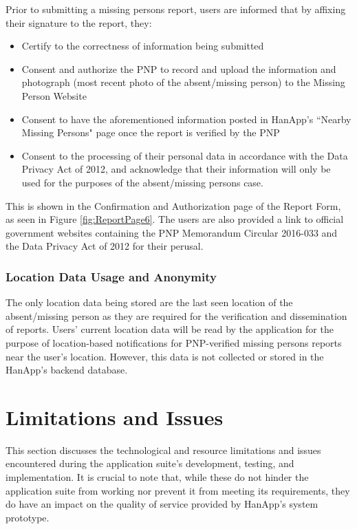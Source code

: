 Prior to submitting a missing persons report, users are informed that by affixing their signature to the report, they:
\begin{itemize}
    \item Certify to the correctness of information being submitted
    \item Consent and authorize the PNP to record and upload the information and photograph (most recent photo of the absent/missing person) to the Missing Person Website
    \item Consent to have the aforementioned information posted in HanApp's ``Nearby Missing Persons" page once the report is verified by the PNP
    \item Consent to the processing of their personal data in accordance with the Data Privacy Act of 2012, and acknowledge that their information will only be used for the purposes of the absent/missing persons case.
\end{itemize}

This is shown in the Confirmation and Authorization page of the Report Form, as seen in Figure \ref{fig:ReportPage6}. The users are also provided a link to official government websites containing the PNP Memorandum Circular 2016-033 and the Data Privacy Act of 2012 for their perusal.


\subsubsection{Location Data Usage and Anonymity}

The only location data being stored are the last seen location of the absent/missing person as they are required for the verification and dissemination of reports. Users' current location data will be read by the application for the purpose of location-based notifications for PNP-verified missing persons reports near the user's location. However, this data is not collected or stored in the HanApp's backend database. 


\section{Limitations and Issues}

This section discusses the technological and resource limitations and issues encountered during the application suite’s development, testing, and implementation. It is crucial to note that, while these do not hinder the application suite from working nor prevent it from meeting its requirements, they do have an impact on the quality of service provided by HanApp's system prototype. 

